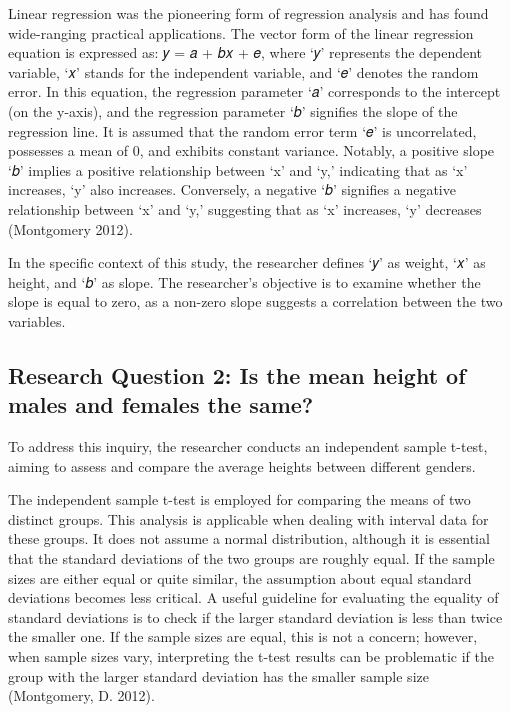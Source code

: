 \documentclass[
]{article}
\begin{document}
Linear regression was the pioneering form of regression analysis and has found wide-ranging practical applications. The vector form of the linear regression equation is expressed as: 𝑦 = 𝑎 + 𝑏𝑥 + 𝑒, where `𝑦' represents the dependent variable, `𝑥' stands for the independent variable, and `𝑒' denotes the random error. In this equation, the regression parameter `𝑎' corresponds to the intercept (on the y-axis), and the regression parameter `𝑏' signifies the slope of the regression line. It is assumed that the random error term `𝑒' is uncorrelated, possesses a mean of 0, and exhibits constant variance. Notably, a positive slope `𝑏' implies a positive relationship between `x' and `y,' indicating that as `x' increases, `y' also increases. Conversely, a negative `𝑏' signifies a negative relationship between `x' and `y,' suggesting that as `x' increases, `y' decreases (Montgomery 2012).

In the specific context of this study, the researcher defines `𝑦' as weight, `𝑥' as height, and `𝑏' as slope. The researcher's objective is to examine whether the slope is equal to zero, as a non-zero slope suggests a correlation between the two variables.

\hypertarget{research-question-2-is-the-mean-height-of-males-and-females-the-same}{%
\subsection{Research Question 2: Is the mean height of males and females the same?}\label{research-question-2-is-the-mean-height-of-males-and-females-the-same}}

To address this inquiry, the researcher conducts an independent sample t-test, aiming to assess and compare the average heights between different genders.

The independent sample t-test is employed for comparing the means of two distinct groups. This analysis is applicable when dealing with interval data for these groups. It does not assume a normal distribution, although it is essential that the standard deviations of the two groups are roughly equal. If the sample sizes are either equal or quite similar, the assumption about equal standard deviations becomes less critical. A useful guideline for evaluating the equality of standard deviations is to check if the larger standard deviation is less than twice the smaller one. If the sample sizes are equal, this is not a concern; however, when sample sizes vary, interpreting the t-test results can be problematic if the group with the larger standard deviation has the smaller sample size (Montgomery, D. 2012).
\end{document}
